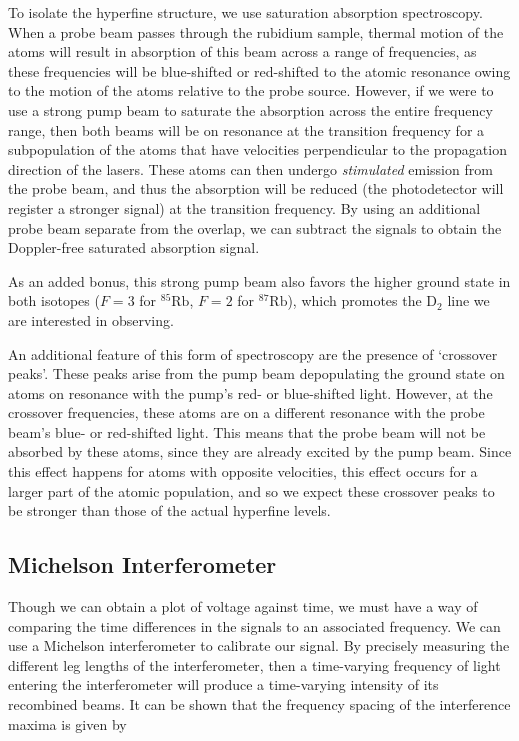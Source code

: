 \documentclass[12pt]{article}
\begin{document}
To isolate the hyperfine structure, we use saturation absorption spectroscopy.  When a probe beam passes through the rubidium sample, thermal motion of the atoms will result in absorption of this beam across a range of frequencies, as these frequencies will be blue-shifted or red-shifted to the atomic resonance owing to the motion of the atoms relative to the probe source.  However, if we were to use a strong pump beam to saturate the absorption across the entire frequency range, then both beams will be on resonance at the transition frequency for a subpopulation of the atoms that have velocities perpendicular to the propagation direction of the lasers.  These atoms can then undergo \textit{stimulated} emission from the probe beam, and thus the absorption will be reduced (the photodetector will register a stronger signal) at the transition frequency.  By using an additional probe beam separate from the overlap, we can subtract the signals to obtain the Doppler-free saturated absorption signal.

As an added bonus, this strong pump beam also favors the higher ground state in both isotopes ($F=3$ for ${}^{85}\text{Rb}$, $F = 2$ for ${}^{87}\text{Rb}$), which promotes the D$_2$ line we are interested in observing.

An additional feature of this form of spectroscopy are the presence of `crossover peaks'.  These peaks arise from the pump beam depopulating the ground state on atoms on resonance with the pump's red- or blue-shifted light.  However, at the crossover frequencies, these atoms are on a different resonance with the probe beam's blue- or red-shifted light.  This means that the probe beam will not be absorbed by these atoms, since they are already excited by the pump beam.  Since this effect happens for atoms with opposite velocities, this effect occurs for a larger part of the atomic population, and so we expect these crossover peaks to be stronger than those of the actual hyperfine levels.

\subsection*{Michelson Interferometer}

Though we can obtain a plot of voltage against time, we must have a way of comparing the time differences in the signals to an associated frequency.  We can use a Michelson interferometer to calibrate our signal.  By precisely measuring the different leg lengths of the interferometer, then a time-varying frequency of light entering the interferometer will produce a time-varying intensity of its recombined beams.  It can be shown that the frequency spacing of the interference maxima is given by
\end{document}
